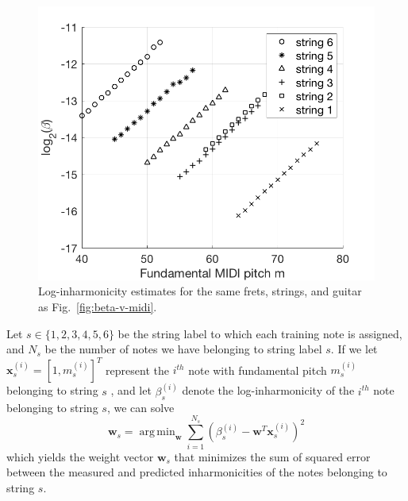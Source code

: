 \documentclass[convention,peer-reviewed]{aesconf}
\DeclareMathOperator*{\argmin}{arg\,min}
\begin{document}
\begin{figure}[!t] 
\centering
\includegraphics[scale=0.25]{log-beta-v-midi}
%
\caption{Log-inharmonicity estimates for the same frets, strings, and guitar as Fig.~\ref{fig:beta-v-midi}.}
\label{fig:log-beta-v-midi}
\end{figure}

Let $s \in \{1,2,3,4,5,6\}$ be the string label to which each training note is assigned, and $N_s$ be the number of notes we have belonging to string label $s$. If we let $\mathbf{x}_s^{(i)} = [1, m_s^{(i)}]^T$ represent the $i^{th}$  note with fundamental pitch $m^{(i)}_s$ belonging to string $s$ , and let $\beta_s^{(i)}$ denote the log-inharmonicity of the $i^{th}$ note belonging to string $s$, we can solve
\begin{equation}
\label{lin-reg}
\mathbf{w}_s = \argmin_{\mathbf{w}}{\sum_{i=1}^{N_s}{(\beta^{(i)}_s - \mathbf{w}^T\mathbf{x}^{(i)}_s)^2}}
\end{equation}
which yields the weight vector $\mathbf{w}_s$ that minimizes the sum of squared error between the measured and predicted inharmonicities of the notes belonging to string $s$.
\end{document}
